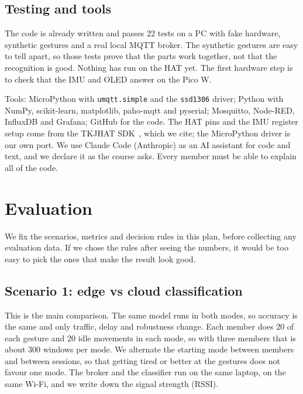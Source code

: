 \documentclass{article}
\begin{document}
\subsection{Testing and tools}

The code is already written and passes 22 tests on a PC with fake hardware, synthetic gestures and a real local MQTT broker. The synthetic gestures are easy to tell apart, so those tests prove that the parts work together, not that the recognition is good. Nothing has run on the HAT yet. The first hardware step is to check that the IMU and OLED answer on the Pico W.

Tools: MicroPython with \texttt{umqtt.simple} and the \texttt{ssd1306} driver; Python with NumPy, scikit-learn, matplotlib, paho-mqtt and pyserial; Mosquitto, Node-RED, InfluxDB and Grafana; GitHub for the code. The HAT pins and the IMU register setup come from the TKJHAT SDK~\cite{tkjhat}, which we cite; the MicroPython driver is our own port. We use Claude Code (Anthropic) as an AI assistant for code and text, and we declare it as the course asks. Every member must be able to explain all of the code.

\section{Evaluation}

We fix the scenarios, metrics and decision rules in this plan, before collecting any evaluation data. If we chose the rules after seeing the numbers, it would be too easy to pick the ones that make the result look good.

\subsection{Scenario 1: edge vs cloud classification}

This is the main comparison. The same model runs in both modes, so accuracy is the same and only traffic, delay and robustness change. Each member does 20 of each gesture and 20 idle movements in each mode, so with three members that is about 300 windows per mode. We alternate the starting mode between members and between sessions, so that getting tired or better at the gestures does not favour one mode. The broker and the classifier run on the same laptop, on the same Wi-Fi, and we write down the signal strength (RSSI).
\end{document}
